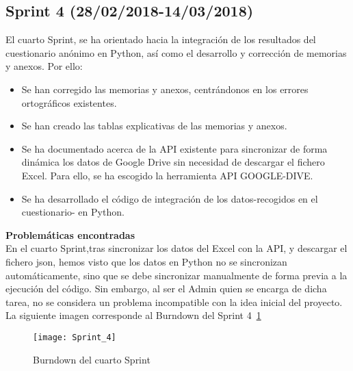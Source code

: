 \subsection{\textbf{Sprint 4} (28/02/2018-14/03/2018) }
El cuarto  Sprint, se ha orientado hacia la integración de los resultados del cuestionario anónimo en Python, así como el desarrollo y corrección de memorias y anexos. 
Por ello: 
\begin{itemize}
\item Se han corregido las memorias y anexos, centrándonos en los errores ortográficos existentes.  
\item Se han creado las tablas explicativas de las memorias y anexos. 
\item Se ha documentado acerca de la API existente para sincronizar de forma dinámica los datos de Google Drive sin necesidad de descargar el fichero Excel. Para ello, se ha escogido la herramienta API GOOGLE-DIVE. 
\item Se ha desarrollado el código de integración de los datos-recogidos en el cuestionario- en Python.   
\end{itemize}
\textbf{Problemáticas encontradas}\\En el cuarto Sprint,tras sincronizar los datos del Excel con la API, y descargar el fichero json, hemos visto que los datos en Python no se sincronizan automáticamente, sino que se debe sincronizar manualmente de forma previa a la ejecución del código. Sin embargo, al ser el Admin quien se encarga de dicha tarea, no se considera un problema incompatible con la idea inicial del proyecto.  
 \\La siguiente imagen corresponde al Burndown del Sprint 4~\ref{fig:A.2.4}
\begin{figure}[h]
\centering
\texttt{[image: Sprint\_4]}
\caption{Burndown del cuarto Sprint}
\label{fig:A.2.4}
\end{figure}
\\

